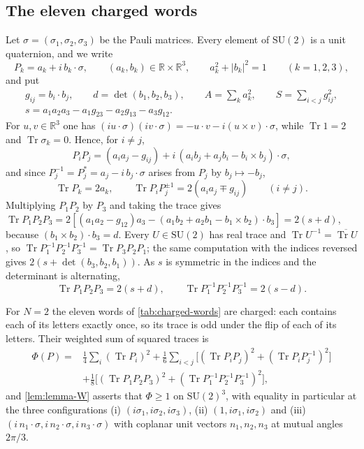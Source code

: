 \documentclass[11pt,a4paper]{amsart}
\theoremstyle{definition}
\theoremstyle{remark}
\numberwithin{equation}{section}
\DeclareMathOperator{\Tr}{Tr}        %
\newcommand{\R}{\mathbb{R}}          %
\newcommand{\abs}[1]{\lvert #1\rvert}      %
\newcommand{\SU}{\mathrm{SU}}              %
\begin{document}
\subsection{The eleven charged words}
Let $\sigma=(\sigma_1,\sigma_2,\sigma_3)$ be the Pauli matrices. Every element of $\SU(2)$ is a unit quaternion, and we write
\begin{equation}\label{eq:lw-coordinates}
P_k=a_k+i\,b_k\cdot\sigma,\qquad(a_k,b_k)\in\R\times\R^3,\qquad a_k^2+\abs{b_k}^2=1\qquad(k=1,2,3),
\end{equation}
and put
\begin{gather*}
g_{ij}=b_i\cdot b_j,\qquad d=\det(b_1,b_2,b_3),\qquad A=\sum_ka_k^2,\qquad S=\sum_{i<j}g_{ij}^2,\\
s=a_1a_2a_3-a_1g_{23}-a_2g_{13}-a_3g_{12}.
\end{gather*}
For $u,v\in\R^3$ one has $(iu\cdot\sigma)(iv\cdot\sigma)=-u\cdot v-i(u\times v)\cdot\sigma$, while $\Tr1=2$ and $\Tr\sigma_k=0$. Hence, for $i\neq j$,
\[
P_iP_j=(a_ia_j-g_{ij})+i\,(a_ib_j+a_jb_i-b_i\times b_j)\cdot\sigma ,
\]
and since $P_j^{-1}=P_j^{*}=a_j-i\,b_j\cdot\sigma$ arises from $P_j$ by $b_j\mapsto-b_j$,
\begin{equation}\label{eq:lw-traces}
\Tr P_k=2a_k,\qquad\Tr P_iP_j^{\pm1}=2(a_ia_j\mp g_{ij})\qquad(i\neq j).
\end{equation}
Multiplying $P_1P_2$ by $P_3$ and taking the trace gives
$\Tr P_1P_2P_3=2[(a_1a_2-g_{12})a_3-(a_1b_2+a_2b_1-b_1\times b_2)\cdot b_3]=2(s+d)$, because $(b_1\times b_2)\cdot b_3=d$. Every $U\in\SU(2)$ has real trace and $\Tr U^{-1}=\overline{\Tr U}$, so $\Tr P_1^{-1}P_2^{-1}P_3^{-1}=\Tr P_3P_2P_1$; the same computation with the indices reversed gives $2(s+\det(b_3,b_2,b_1))$. As $s$ is symmetric in the indices and the determinant is alternating,
\begin{equation}\label{eq:lw-triple}
\Tr P_1P_2P_3=2(s+d),\qquad\Tr P_1^{-1}P_2^{-1}P_3^{-1}=2(s-d).
\end{equation}

For $N=2$ the eleven words of \cref{tab:charged-words} are charged: each contains each of its letters exactly once, so its trace is odd under the flip of each of its letters. Their weighted sum of squared traces is
\begin{equation}\label{eq:lw-phi}
\begin{split}
\Phi(P)={}&\frac14\sum_i(\Tr P_i)^2+\frac16\sum_{i<j}\bigl[(\Tr P_iP_j)^2+(\Tr P_iP_j^{-1})^2\bigr]\\
&+\frac18\bigl[(\Tr P_1P_2P_3)^2+(\Tr P_1^{-1}P_2^{-1}P_3^{-1})^2\bigr],
\end{split}
\end{equation}
and \cref{lem:lemma-W} asserts that $\Phi\ge1$ on $\SU(2)^3$, with equality in particular at the three configurations
(i) $(i\sigma_1,i\sigma_2,i\sigma_3)$, (ii) $(1,i\sigma_1,i\sigma_2)$ and (iii) $(i\,n_1\cdot\sigma,i\,n_2\cdot\sigma,i\,n_3\cdot\sigma)$ with coplanar unit vectors $n_1,n_2,n_3$ at mutual angles $2\pi/3$.
\end{document}
